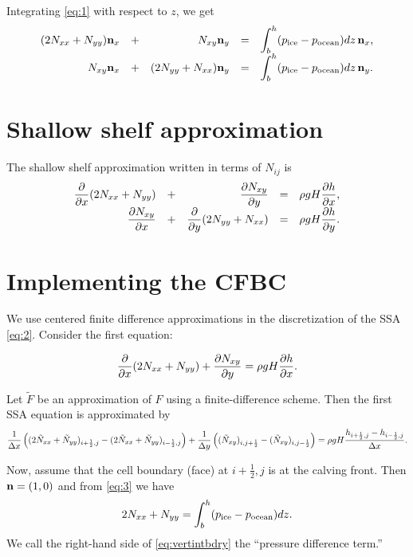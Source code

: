 \documentclass[11pt]{article}
\begin{document}
Integrating \eqref{eq:1} with respect to $z$, we get
\begin{equation}
\label{eq:3}
\begin{array}{rcrcl}
(2N_{xx} + N_{yy}) \mathbf{n}_{x} &+& N_{xy} \mathbf{n}_{y} &=& \displaystyle \int_{b}^{h}(p_{\text{ice}} - p_{\text{ocean}}) dz\, \mathbf{n}_{x},\\
N_{xy} \mathbf{n}_{x} &+& (2N_{yy} + N_{xx}) \mathbf{n}_{y} &=& \displaystyle \int_{b}^{h}(p_{\text{ice}} - p_{\text{ocean}}) dz\, \mathbf{n}_{y}.
\end{array}
\end{equation}

\section{Shallow shelf approximation}
\label{sec-3}

The shallow shelf approximation written in terms of $N_{ij}$ is
\begin{equation}
\label{eq:2}
\begin{array}{rcrcl}
\displaystyle \frac{\partial }{\partial x}(2N_{xx} + N_{yy}) &+& \displaystyle \frac{\partial N_{xy}}{\partial y} &=& \displaystyle \rho g H \frac{\partial h}{\partial x},\\
\displaystyle \frac{\partial N_{xy}}{\partial x} &+& \displaystyle \frac{\partial }{\partial y}(2N_{yy} + N_{xx}) &=& \displaystyle \rho g H \frac{\partial h}{\partial y}.
\end{array}
\end{equation}

\section{Implementing the CFBC}
\label{sec-4}

We use centered finite difference approximations in the discretization
of the SSA \eqref{eq:2}.  Consider the first equation:

\begin{equation}
\label{eq:4}
\frac{\partial }{\partial x}(2N_{xx} + N_{yy}) + \displaystyle \frac{\partial N_{xy}}{\partial y} = \displaystyle \rho g H \frac{\partial h}{\partial x}.
\end{equation}

\newcommand{\partI}{(2\tilde N_{xx} + \tilde N_{yy})}
\newcommand{\partII}{(\tilde N_{xy})}
Let $\tilde F$ be an approximation of $F$ using a finite-difference
scheme. Then the first SSA equation is approximated by
\begin{equation*}
\frac1{\dx}\left(\partI_{i+\frac12,j} - \partI_{i-\frac12,j}\right) +
\frac1{\dy}\left(\partII_{i,j+\frac12} - \partII_{i,j-\frac12}\right) =
\rho g H \frac{h_{i+\frac12,j} - h_{i-\frac12,j}}{\dx}.
\end{equation*}

Now, assume that the cell boundary (face) at $i+\frac12,j$ is at the
calving front. Then $\mathbf{n} = (1,0)$ and from \eqref{eq:3} we have
\begin{equation}
2N_{xx} + N_{yy} = \int_{b}^{h}(p_{\text{ice}} - p_{\text{ocean}}) dz.  \label{eq:vertintbdry}
\end{equation}
We call the right-hand side of \eqref{eq:vertintbdry} the ``pressure difference term.''
\end{document}
